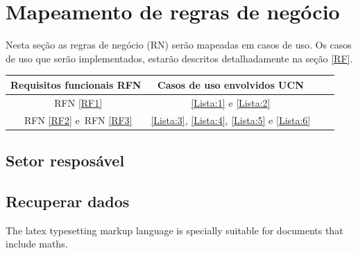 \documentclass[
	12pt,				%
    oneside,			%
	a4paper,			%
	english,			%
	french,				%
	spanish,			%
	brazil,				%
	]{abntex2}
\begin{document}
	
	\section{Mapeamento de regras de negócio}	
		 Nesta seção as regras de negócio (RN) serão mapeadas em casos de uso. Os casos de uso que serão implementados, estarão descritos detalhadamente na seção \ref{RF}.
	
		\begin{center}
			\begin{tabular}{ |c|c|c|c| } 
				\hline
				Requisitos funcionais
				RFN  & Casos de uso envolvidos
				UCN \\
				\hline
				~RFN \ref{RF1} & \ref{Lista:1} e \ref{Lista:2} \\ 
				\hline
				~RFN \ref{RF2}  e~RFN  \ref{RF3} & \ref{Lista:3}, \ref{Lista:4}, \ref{Lista:5} e \ref{Lista:6}   \\ 
				\hline
				
			\end{tabular}
		\end{center}
		\subsection{Setor resposável}
		
		\subsection{Recuperar dados}

			
	
	




\postextual



%

The \Gls{latex} typesetting markup language is specially suitable 
for documents that include \gls{maths}. 

\clearpage
\end{document}
